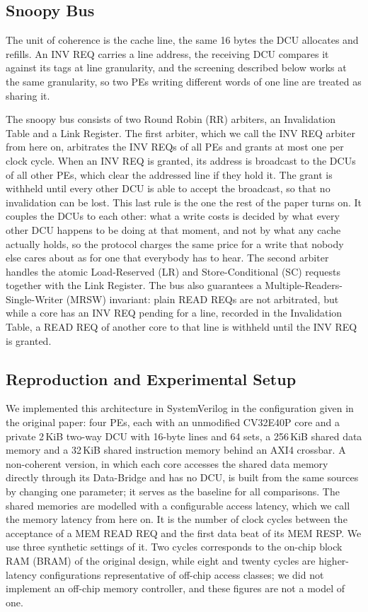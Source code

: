 \documentclass[conference]{IEEEtran}
\begin{document}
\subsection{Snoopy Bus}

The unit of coherence is the cache line, the same 16 bytes the DCU allocates
and refills. An INV REQ carries a line address, the receiving DCU compares it
against its tags at line granularity, and the screening described below works
at the same granularity, so two PEs writing different words of one line are
treated as sharing it.

The snoopy bus consists of two Round Robin (RR) arbiters, an Invalidation Table
and a Link Register. The first arbiter, which we call the INV REQ arbiter
from here on, arbitrates the INV REQs of all PEs and grants at most one per
clock cycle. When an INV REQ is granted, its address is broadcast to the DCUs
of all other PEs, which clear the addressed line if they hold it. The grant is
withheld until every other DCU is able to accept the broadcast, so that no
invalidation can be lost. This last rule is the one the rest of the paper
turns on. It couples the DCUs to each other: what a write costs is decided by
what every other DCU happens to be doing at that moment, and not by what any
cache actually holds, so the protocol charges the same price for a write that
nobody else cares about as for one that everybody has to hear. The second arbiter handles the atomic Load-Reserved
(LR) and Store-Conditional (SC) requests together with the Link Register. The
bus also guarantees a Multiple-Readers-Single-Writer (MRSW) invariant: plain
READ REQs are not arbitrated, but while a core has an INV REQ pending for a
line, recorded in the Invalidation Table, a READ REQ of another core to that
line is withheld until the INV REQ is granted.

\subsection{Reproduction and Experimental Setup}

We implemented this architecture in SystemVerilog in the configuration given
in the original paper: four PEs, each with an unmodified CV32E40P core and a
private 2\,KiB two-way DCU with 16-byte lines and 64 sets, a 256\,KiB shared
data memory and a 32\,KiB shared instruction memory behind an AXI4 crossbar.
A non-coherent version, in which each core accesses the shared data memory
directly through its Data-Bridge and has no DCU, is built from the same
sources by changing one parameter; it serves as the baseline for all
comparisons. The shared memories are modelled with a configurable access
latency, which we call the memory latency from here on. It is the number of
clock cycles between the acceptance of a MEM READ REQ and the first data beat
of its MEM RESP. We use three synthetic settings of it. Two cycles corresponds to the
on-chip block RAM (BRAM) of the original design, while eight and twenty cycles
are higher-latency configurations representative of off-chip access classes;
we did not implement an off-chip memory controller, and these figures are not
a model of one.
\end{document}
